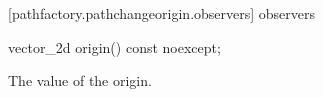  [pathfactory.pathchangeorigin.observers]{ observers}

\begin{itemdecl}
    vector_2d origin() const noexcept;
\end{itemdecl}
\begin{itemdescr}
	\pnum
	\returns
	The value of the origin.
\end{itemdescr}
